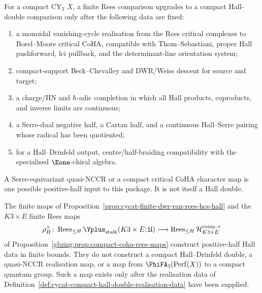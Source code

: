 \begin{definition}
\label{def:cycat-compact-hall-double-realisation-data}
For a compact CY$_3$ \(X\), a finite Rees comparison upgrades to a
compact Hall-double comparison only after the following data are fixed:
\begin{enumerate}[label=\textup{(\roman*)}]
 \item a monoidal vanishing-cycle realisation from the Rees critical
 complexes to Borel--Moore critical CoHA, compatible with
 Thom--Sebastiani, proper Hall pushforward, lci pullback, and the
 determinant-line orientation system;
 \item compact-support Beck--Chevalley and DWR/Weiss descent for source
 and target;
 \item a charge/HN and \(\hbar\)-adic completion in which all Hall
 products, coproducts, and inverse limits are continuous;
 \item a Serre-dual negative half, a Cartan half, and a continuous
 Hall--Serre pairing whose radical has been quotiented;
 \item for a Hall--Drinfeld output, centre/half-braiding compatibility
 with the specialised \(\Eone\)-chiral algebra.
\end{enumerate}
A Serre-equivariant quasi-NCCR or a compact critical CoHA character map
is one possible positive-half input to this package. It is not itself a
Hall double.
\end{definition}

\begin{proposition}
\label{prop:cycat-compact-hall-double-boundary}
The finite maps of Proposition~\ref{prop:cycat-finite-dwr-ran-rees-hcs-hall}
and the \(K3\times E\) finite Rees maps
\[
 \rho_H^+\colon
 \operatorname{Rees}_{\le H}
 \Yplus_{\mathrm{stalk}}(K3\times E;\mathfrak U)
 \longrightarrow
 \operatorname{Rees}_{\le H}
 \mathcal H_{K3\times E}^{\mathrm{comp},+}
\]
of Proposition~\ref{gluing:prop:compact-coha-rees-maps} construct
positive-half Hall data in finite bounds. They do not construct a
compact Hall--Drinfeld double, a quasi-NCCR realisation map, or a map
from \(\PhiFA_3(\mathrm{Perf}(X))\) to a compact quantum group. Such a
map exists only after the realisation data of
Definition~\ref{def:cycat-compact-hall-double-realisation-data} have
been supplied.
\end{proposition}

